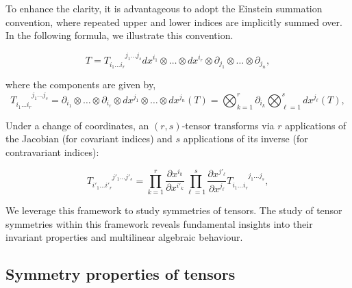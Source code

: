 To enhance the clarity, it is advantageous to adopt the Einstein summation convention, where repeated upper and lower indices are implicitly summed over. In the following formula, we illustrate this convention.

\begin{equation}
T=T_{i_{1}\dots i_{r}}^{\phantom{i_{1}\dots i_{r}}j_{1}\dots j_{s}}dx^{i_{1}}\otimes\dots\otimes dx^{i_{r}}\otimes \partial_{j_{1}}\otimes\dots\otimes \partial_{j_{n}},
\end{equation}

where the components are given by,
\begin{equation}
T_{i_{1}\dots i_{r}}^{\phantom{i_{1}\dots i_{r}}j_{1}\dots j_{s}}=\partial_{i_{1}}\otimes\dots\otimes \partial_{i_{r}}\otimes dx^{j_{1}}\otimes\dots\otimes dx^{j_{n}}(T)= \bigotimes_{k=1}^{r}\partial_{i_{k}} \bigotimes_{\ell=1}^{s}dx^{j_{\ell}}(T),
\end{equation}

Under a change of coordinates, an $(r,s)$-tensor transforms via 
$r$ applications of the Jacobian (for covariant indices) and 
$s$ applications of its inverse (for contravariant indices):


\begin{equation}
T_{i'_{1}\dots i'_{r}}^{\phantom{i'_{1}\dots i'_{r}}j'_{1}\dots j'_{s}}=\prod_{k=1}^{r}\frac{\partial x^{i_{k}}}{\partial x^{i'_{k}}} \prod_{\ell=1}^{s}\frac{\partial x^{j'_{\ell}}}{\partial x^{j_{\ell}}}T_{i_{1}\dots i_{r}}^{\phantom{i_{1}\dots i_{r}}j_{1}\dots j_{s}},
\end{equation}


We leverage this framework to study  symmetries of tensors. The study of tensor symmetries within this framework reveals fundamental insights into their invariant properties and multilinear algebraic behaviour.

\subsection{Symmetry properties of tensors}

